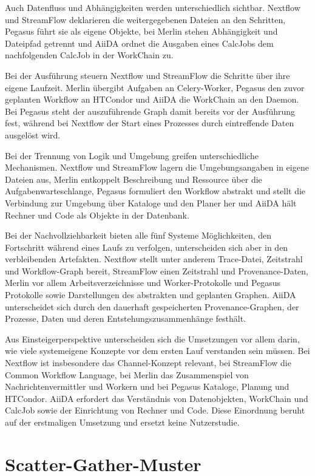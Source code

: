 Auch Datenfluss und Abhängigkeiten werden unterschiedlich sichtbar.
Nextflow und StreamFlow deklarieren die weitergegebenen Dateien an
den Schritten, Pegasus führt sie als eigene Objekte, bei Merlin
stehen Abhängigkeit und Dateipfad getrennt und AiiDA ordnet die
Ausgaben eines CalcJobs dem nachfolgenden CalcJob in der WorkChain
zu.

Bei der Ausführung steuern Nextflow und StreamFlow die Schritte über
ihre eigene Laufzeit. Merlin übergibt Aufgaben an Celery-Worker,
Pegasus den zuvor geplanten Workflow an HTCondor und AiiDA die
WorkChain an den Daemon. Bei Pegasus steht der auszuführende Graph
damit bereits vor der Ausführung fest, während bei Nextflow der Start
eines Prozesses durch eintreffende Daten ausgelöst wird.

Bei der Trennung von Logik und Umgebung greifen unterschiedliche
Mechanismen. Nextflow und StreamFlow lagern die Umgebungsangaben in
eigene Dateien aus, Merlin entkoppelt Beschreibung und Ressource über
die Aufgabenwarteschlange, Pegasus formuliert den Workflow abstrakt
und stellt die Verbindung zur Umgebung über Kataloge und den Planer
her und AiiDA hält Rechner und Code als Objekte in der Datenbank.

Bei der Nachvollziehbarkeit bieten alle fünf Systeme Möglichkeiten,
den Fortschritt während eines Laufs zu verfolgen, unterscheiden sich
aber in den verbleibenden Artefakten. Nextflow stellt unter anderem
Trace-Datei, Zeitstrahl und Workflow-Graph bereit, StreamFlow einen
Zeitstrahl und Provenance-Daten, Merlin vor allem Arbeitsverzeichnisse
und Worker-Protokolle und Pegasus Protokolle sowie Darstellungen des
abstrakten und geplanten Graphen. AiiDA unterscheidet sich durch den
dauerhaft gespeicherten Provenance-Graphen, der Prozesse, Daten und
deren Entstehungszusammenhänge festhält.

Aus Einsteigerperspektive unterscheiden sich die Umsetzungen vor
allem darin, wie viele systemeigene Konzepte vor dem ersten Lauf
verstanden sein müssen. Bei Nextflow ist insbesondere das Channel-Konzept relevant, bei StreamFlow die Common Workflow Language, bei Merlin das
Zusammenspiel von Nachrichtenvermittler und Workern und bei Pegasus
Kataloge, Planung und HTCondor. AiiDA erfordert das Verständnis von
Datenobjekten, WorkChain und CalcJob sowie der Einrichtung von
Rechner und Code. Diese Einordnung beruht auf der erstmaligen
Umsetzung und ersetzt keine Nutzerstudie.


\section{Scatter-Gather-Muster}
\label{sec:lokal:scattergather}

